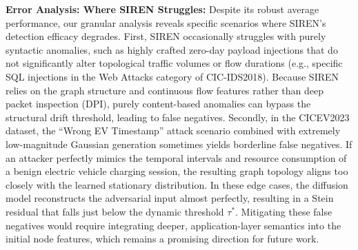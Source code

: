 \textbf{Error Analysis: Where SIREN Struggles:}
Despite its robust average performance, our granular analysis reveals specific scenarios where SIREN's detection efficacy degrades. First, SIREN occasionally struggles with purely syntactic anomalies, such as highly crafted zero-day payload injections that do not significantly alter topological traffic volumes or flow durations (e.g., specific SQL injections in the Web Attacks category of CIC-IDS2018). Because SIREN relies on the graph structure and continuous flow features rather than deep packet inspection (DPI), purely content-based anomalies can bypass the structural drift threshold, leading to false negatives. Secondly, in the CICEV2023 dataset, the ``Wrong EV Timestamp'' attack scenario combined with extremely low-magnitude Gaussian generation sometimes yields borderline false negatives. If an attacker perfectly mimics the temporal intervals and resource consumption of a benign electric vehicle charging session, the resulting graph topology aligns too closely with the learned stationary distribution. In these edge cases, the diffusion model reconstructs the adversarial input almost perfectly, resulting in a Stein residual that falls just below the dynamic threshold $\tau^*$. Mitigating these false negatives would require integrating deeper, application-layer semantics into the initial node features, which remains a promising direction for future work.
